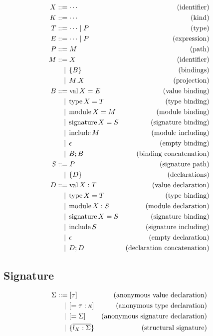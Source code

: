 \begin{align*}
  X &\BNFassign \cdots &(\text{identifier}) \\
  K &\BNFassign \cdots &(\text{kind}) \\
  T &\BNFassign \cdots \mid P &(\text{type}) \\
  E &\BNFassign \cdots \mid P &(\text{expression}) \\
  P &\BNFassign M &(\text{path}) \\
  M
  &\BNFassign X &(\text{identifier}) \\
  &\BNFor \{ B \} &(\text{bindings}) \\
  &\BNFor M.X &(\text{projection}) \\
  B
  &\BNFassign \symval X = E &(\text{value binding}) \\
  &\BNFor \symtype X = T &(\text{type binding}) \\
  &\BNFor \symmodule X = M &(\text{module binding}) \\
  &\BNFor \symsignature X = S &(\text{signature binding}) \\
  &\BNFor \syminclude M &(\text{module including}) \\
  &\BNFor \epsilon &(\text{empty binding}) \\
  &\BNFor B; B &(\text{binding concatenation}) \\
  S
  &\BNFassign P &(\text{signature path}) \\
  &\BNFor \{ D \} &(\text{declarations}) \\
  D
  &\BNFassign \symval X: T &(\text{value declaration}) \\
  &\BNFor \symtype X = T &(\text{type binding}) \\
  &\BNFor \symmodule X: S &(\text{module declaration}) \\
  &\BNFor \symsignature X = S &(\text{signature binding}) \\
  &\BNFor \syminclude S &(\text{signature including}) \\
  &\BNFor \epsilon &(\text{empty declaration}) \\
  &\BNFor D; D &(\text{declaration concatenation})
\end{align*}

\subsection{Signature}

\begin{align*}
  \Sigma
  &\BNFassign [\tau] &(\text{anonymous value declaration}) \\
  &\BNFor [= \tau: \kappa] &(\text{anonymous type declaration}) \\
  &\BNFor [= \Sigma] &(\text{anonymous signature declaration}) \\
  &\BNFor \{\overline{l_X: \Sigma}\} &(\text{structural signature}) \\
\end{align*}

